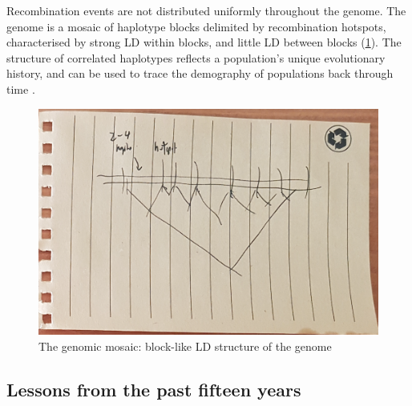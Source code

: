 \begin{outline}
Recombination events are not distributed uniformly throughout the genome.
The genome is a mosaic of haplotype blocks delimited by recombination hotspots, 
characterised by strong \gls{LD} within blocks, and little \gls{LD} between blocks \autocite{wall2003HaplotypeBlocksLinkage,theinternationalhapmapconsortium2007SecondGenerationHuman} (\cref{fig:intro_haplotypeBlocks}).
The structure of correlated haplotypes reflects a population's unique evolutionary history, and can be used to trace the demography of populations back through time \autocite{karczewski2020AnalyticTranslationalGenetics}.

\begin{figure}
    \centering
    \includegraphics[width=1.0\textwidth,page=1]{mainmatter/figures/chapter_01/fig_mockup_haplotypeBlocks_Screenshot 2020-05-21 at 17.08.33.png}
    \caption{The genomic mosaic: block-like \gls{LD} structure of the genome}
    \label{fig:intro_haplotypeBlocks}
\end{figure}

\subsection{Lessons from the past fifteen years}


\end{outline}
